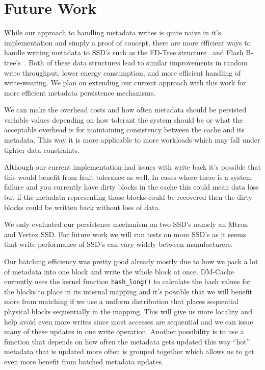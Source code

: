 \section{Future Work}
\label{sec:future}

While our approach to handling metadata writes is quite naive in it's
implementation and simply a proof of concept, there are more efficient
ways to handle writing metadata to SSD's such as the FD-Tree
structure~\cite{FD-Tree} and Flash B-tree's~\cite{FlashB-Tree}. Both
of these data structures lead to similar improvements in random write
throughput, lower energy consumption, and more efficient handling of
write-wearing. We plan on extending our current approach with this
work for more efficient metadata persistence mechanisms.

We can make the overhead costs and how often metadata should be
persisted variable values depending on how tolerant the system should
be or what the acceptable overhead is for maintaining consistency
between the cache and its metadata. This way it is more applicable to
more workloads which may fall under tighter data constraints.

Although our current implementation had issues with write back it's
possible that this would benefit from fault tolerance as well. In
cases where there is a system failure and you currently have dirty
blocks in the cache this could mean data loss but if the metadata
representing those blocks could be recovered then the dirty blocks
could be written back without loss of data.

We only evaluated our persistence mechanism on two SSD's namely an
Mtron and Vertex SSD. For future work we will run tests on more SSD's
as it seems that write performance of SSD's can vary widely between
manufacturers.

Our batching efficiency was pretty good already mostly due to how we
pack a lot of metadata into one block and write the whole block at
once. DM-Cache currently uses the kernel function
\texttt{hash\_long()} to calculate the hash values for the blocks to
place in its internal mapping and it's possible that we will benefit
more from matching if we use a uniform distribution that places
sequential physical blocks sequentially in the mapping. This will give
us more locality and help avoid even more writes since most accesses
are sequential and we can issue many of these updates in one write
operation. Another possibility is to use a function that depends on
how often the metadata gets updated this way ``hot'' metadata that is
updated more often is grouped together which allows us to get even
more benefit from batched metadata updates.
